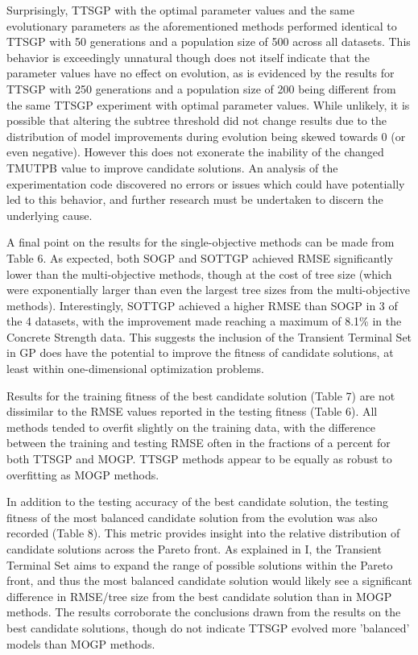 \documentclass[a4paper, twocolumn]{article}
\begin{document}
Surprisingly, TTSGP with the optimal parameter values and the same evolutionary parameters as the aforementioned methods performed identical to TTSGP with 50 generations and a population size of 500 across all datasets. This behavior is exceedingly unnatural though does not itself indicate that the parameter values have no effect on evolution, as is evidenced by the results for TTSGP with 250 generations and a population size of 200 being different from the same TTSGP experiment with optimal parameter values. While unlikely, it is possible that altering the subtree threshold did not change results due to the distribution of model improvements during evolution being skewed towards 0 (or even negative). However this does not exonerate the inability of the changed TMUTPB value to improve candidate solutions. An analysis of the experimentation code discovered no errors or issues which could have potentially led to this behavior, and further research must be undertaken to discern the underlying cause.

A final point on the results for the single-objective methods can be made from Table 6. As expected, both SOGP and SOTTGP achieved RMSE significantly lower than the multi-objective methods, though at the cost of tree size (which were exponentially larger than even the largest tree sizes from the multi-objective methods). Interestingly, SOTTGP achieved a higher RMSE than SOGP in 3 of the 4 datasets, with the improvement made reaching a maximum of 8.1\% in the Concrete Strength data. This suggests the inclusion of the Transient Terminal Set in GP does have the potential to improve the fitness of candidate solutions, at least within one-dimensional optimization problems.

Results for the training fitness of the best candidate solution (Table 7) are not dissimilar to the RMSE values reported in the testing fitness (Table 6). All methods tended to overfit slightly on the training data, with the difference between the training and testing RMSE often in the fractions of a percent for both TTSGP and MOGP. TTSGP methods appear to be equally as robust to overfitting as MOGP methods.

In addition to the testing accuracy of the best candidate solution, the testing fitness of the most balanced candidate solution from the evolution was also recorded (Table 8). This metric provides insight into the relative distribution of candidate solutions across the Pareto front. As explained in I, the Transient Terminal Set aims to expand the range of possible solutions within the Pareto front, and thus the most balanced candidate solution would likely see a significant difference in RMSE/tree size from the best candidate solution than in MOGP methods. The results corroborate the conclusions drawn from the results on the best candidate solutions, though do not indicate TTSGP evolved more 'balanced' models than MOGP methods.
\end{document}
